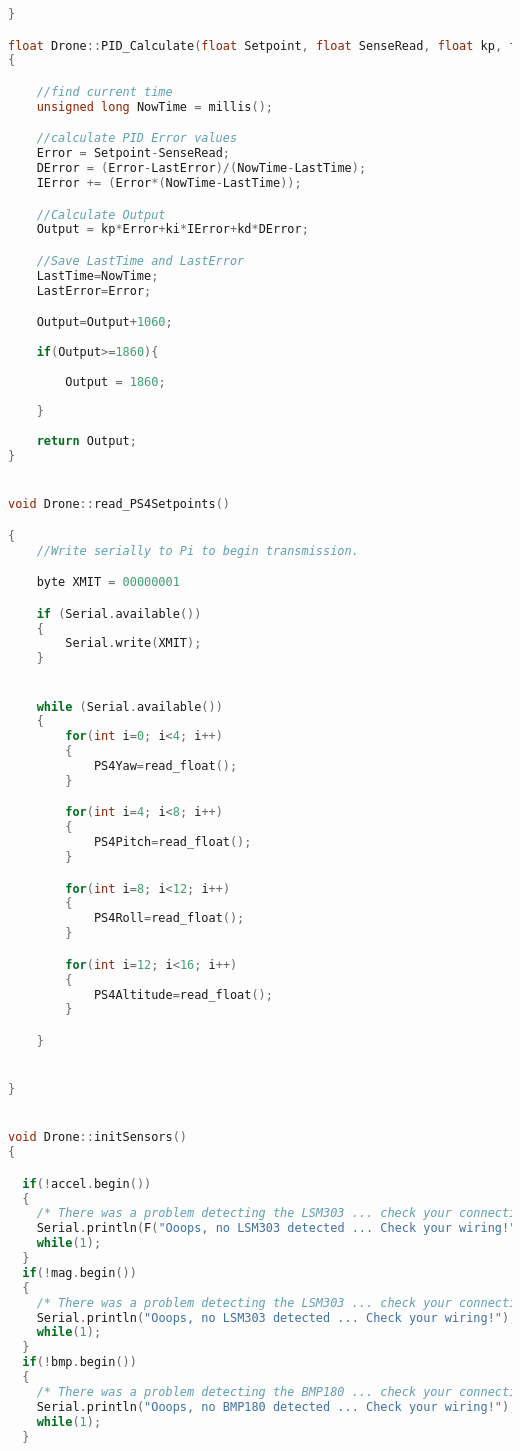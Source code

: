 \begin{lstlisting}[language=C,caption={Drone.cpp Arduino Library File},label={lst:Drone.cpp}]
}

float Drone::PID_Calculate(float Setpoint, float SenseRead, float kp, float kd, float ki )
{

    //find current time
    unsigned long NowTime = millis();

    //calculate PID Error values
    Error = Setpoint-SenseRead;
    DError = (Error-LastError)/(NowTime-LastTime);
    IError += (Error*(NowTime-LastTime));

    //Calculate Output
    Output = kp*Error+ki*IError+kd*DError;

    //Save LastTime and LastError
    LastTime=NowTime;
    LastError=Error;

    Output=Output+1060;
    
    if(Output>=1860){
        
        Output = 1860; 
        
    }
    
    return Output;
}


void Drone::read_PS4Setpoints()

{
    //Write serially to Pi to begin transmission.

    byte XMIT = 00000001

    if (Serial.available())
    {
        Serial.write(XMIT);
    }


    while (Serial.available())
    {
        for(int i=0; i<4; i++)
        {
            PS4Yaw=read_float();
        }

        for(int i=4; i<8; i++)
        {
            PS4Pitch=read_float();
        }

        for(int i=8; i<12; i++)
        {
            PS4Roll=read_float();
        }

        for(int i=12; i<16; i++)
        {
            PS4Altitude=read_float();
        }

    }


}


void Drone::initSensors()
{

  if(!accel.begin())
  {
    /* There was a problem detecting the LSM303 ... check your connections */
    Serial.println(F("Ooops, no LSM303 detected ... Check your wiring!"));
    while(1);
  }
  if(!mag.begin())
  {
    /* There was a problem detecting the LSM303 ... check your connections */
    Serial.println("Ooops, no LSM303 detected ... Check your wiring!");
    while(1);
  }
  if(!bmp.begin())
  {
    /* There was a problem detecting the BMP180 ... check your connections */
    Serial.println("Ooops, no BMP180 detected ... Check your wiring!");
    while(1);
  }


\end{lstlisting}
